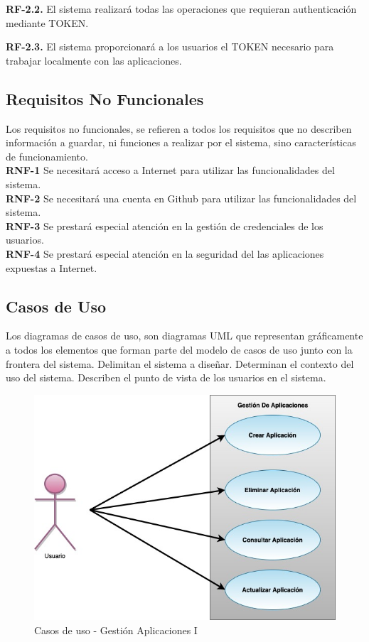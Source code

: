 \documentclass[a4paper,11pt]{book}
\begin{document}
\textbf{RF-2.2.} El sistema  realizará todas las operaciones que requieran authenticación mediante TOKEN.  

\textbf{RF-2.3.} El sistema  proporcionará a los usuarios el TOKEN necesario para trabajar localmente con las aplicaciones. 
   

\subsection{Requisitos No Funcionales }
Los requisitos no funcionales, se refieren a todos los requisitos que no describen información a guardar, ni funciones a realizar por el sistema, sino características de funcionamiento.\\


\textbf{RNF-1} Se necesitará acceso a Internet para utilizar las funcionalidades del sistema.\\

\textbf{RNF-2} Se necesitará una cuenta en Github para utilizar las funcionalidades del sistema.\\

\textbf{RNF-3} Se prestará especial atención en la gestión de credenciales de los usuarios.\\

\textbf{RNF-4} Se prestará especial atención en la seguridad del  las aplicaciones expuestas a Internet.
\subsection{Casos de Uso}
Los diagramas de casos de uso, son diagramas UML que representan gráficamente a todos los elementos que forman parte del modelo de casos de uso junto con la frontera del sistema. Delimitan el sistema a diseñar. Determinan el contexto del uso del sistema. Describen el punto de vista de los usuarios  en el sistema.


\begin{figure}[H]  
\centering 
\includegraphics[scale=0.50]{imagenes/casosUso1.jpg}
\caption{ Casos de uso - Gestión Aplicaciones I\cite{diagrama}  }  
\end{figure}
\end{document}
